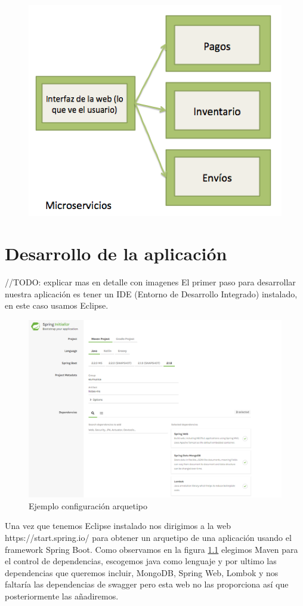 \documentclass[12pt]{report} %
\begin{document}
\begin{figure}
	\centering
	\includegraphics[width=0.7\linewidth]{imagenes/microservices}
	\caption{}
	\label{fig:microservicesGrafic}
\end{figure}

\chapter{Desarrollo de la aplicación}

//TODO: explicar mas en detalle con imagenes
El primer paso para desarrollar nuestra aplicación es tener un IDE (Entorno de Desarrollo Integrado) instalado, en este caso usamos Eclipse.

\begin{figure}
	\centering
	\includegraphics[width=0.7\linewidth]{imagenes/arquetipo}
	\caption{Ejemplo configuración arquetipo}
	\label{fig:arquetipo}
\end{figure}

Una vez que tenemos Eclipse instalado nos dirigimos a la web https://start.spring.io/ para obtener un arquetipo de una aplicación usando el framework Spring Boot. Como observamos en la figura \ref{fig:arquetipo} elegimos Maven para el control de dependencias, escogemos java como lenguaje y por ultimo las dependencias que queremos incluir, MongoDB, Spring Web, Lombok y nos faltaría las dependencias de swagger pero esta web no las proporciona así que posteriormente las añadiremos.
\end{document}
